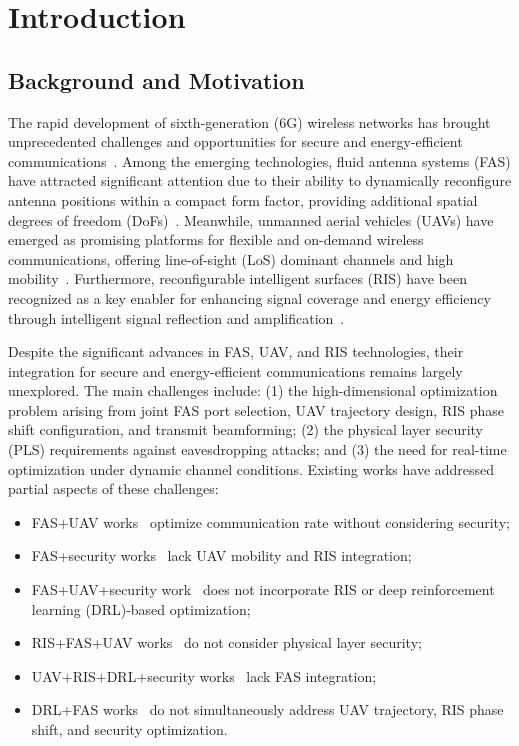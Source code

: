 \section{Introduction}\label{sec:introduction}

\subsection{Background and Motivation}

The rapid development of sixth-generation (6G) wireless networks has brought unprecedented challenges and opportunities for secure and energy-efficient communications~\cite{akyildiz2026fas}. Among the emerging technologies, fluid antenna systems (FAS) have attracted significant attention due to their ability to dynamically reconfigure antenna positions within a compact form factor, providing additional spatial degrees of freedom (DoFs)~\cite{wong2021fluid, zhang2023flexible}. Meanwhile, unmanned aerial vehicles (UAVs) have emerged as promising platforms for flexible and on-demand wireless communications, offering line-of-sight (LoS) dominant channels and high mobility~\cite{reda2026uav, zhu2026uav}. Furthermore, reconfigurable intelligent surfaces (RIS) have been recognized as a key enabler for enhancing signal coverage and energy efficiency through intelligent signal reflection and amplification~\cite{chen2025hybrid, zhang2025ris}.

Despite the significant advances in FAS, UAV, and RIS technologies, their integration for secure and energy-efficient communications remains largely unexplored. The main challenges include: (1) the high-dimensional optimization problem arising from joint FAS port selection, UAV trajectory design, RIS phase shift configuration, and transmit beamforming; (2) the physical layer security (PLS) requirements against eavesdropping attacks; and (3) the need for real-time optimization under dynamic channel conditions. Existing works have addressed partial aspects of these challenges:
\begin{itemize}
    \item FAS+UAV works~\cite{reda2026uav, zhu2026uav, zhang2026uav, liu2026uav} optimize communication rate without considering security;
    \item FAS+security works~\cite{wu2024fasris, ghadi2024ris, yao2024fas, mai2024noma, wu2025variable, zheng2026pls, ghadi2026efas} lack UAV mobility and RIS integration;
    \item FAS+UAV+security work~\cite{wu2025faaav} does not incorporate RIS or deep reinforcement learning (DRL)-based optimization;
    \item RIS+FAS+UAV works~\cite{shen2025ris, yang2026federated} do not consider physical layer security;
    \item UAV+RIS+DRL+security works~\cite{hashempour2026robust} lack FAS integration;
    \item DRL+FAS works~\cite{yang2025intelligent, peng2026grpo, ju2025joint, pakravan2026hybrid, shen2026mf} do not simultaneously address UAV trajectory, RIS phase shift, and security optimization.
\end{itemize}

